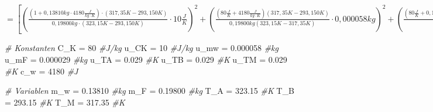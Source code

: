 \documentclass[class=article, crop=false]{standalone}
\newenvironment{Shaded}{\begin{snugshade}}{\end{snugshade}}
\newcommand{\CommentTok}[1]{\textcolor[rgb]{0.56,0.35,0.01}{\textit{#1}}}
\newcommand{\DecValTok}[1]{\textcolor[rgb]{0.00,0.00,0.81}{#1}}
\newcommand{\FloatTok}[1]{\textcolor[rgb]{0.00,0.00,0.81}{#1}}
\newcommand{\NormalTok}[1]{#1}
\newcommand{\OtherTok}[1]{\textcolor[rgb]{0.56,0.35,0.01}{#1}}
\begin{document}
\(=[(\frac{(1+0,13810kg\cdot 4180\frac{J}{kg\cdot K})\cdot (317,35K-293,150K)}{0,19800kg\cdot (323,15K-293,150K)}\cdot 10\frac{J}{K})^2+(\frac{(80\frac{J}{K}+4180\frac{J}{kg\cdot K})(317,35K-293,150K)}{0,19800kg(323,15K-317,35K)}\cdot 0,000058kg)^2+(\frac{(80\frac{J}{K}+0,13810kg\cdot 4180\frac{J}{kg\cdot K})\cdot (1-293,150K)}{0,19800kg(323,15K-1)}\cdot 0,029K)^2+(\frac{(80\frac{J}{K}+0,13810kg\cdot 4180\frac{J}{kg\cdot K})\cdot (317,35K-1)}{0,19800kg(323,15K-317,35K)}\cdot 0,029K)^2+(\frac{(80\frac{J}{K}+0,13810kg\cdot 4180\frac{J}{kg\cdot K})\cdot (317,35K-293,150K)}{323,15K-317,35K}\cdot 0,000029kg)^2+(\frac{(80\frac{J}{K}+0,13810kg\cdot 4180\frac{J}{kg\cdot K})\cdot (317,35K-293,150K)}{0,19800kg(1-317,35K)}\cdot 0,029K)^2]^{\frac{1}{2}}\)

\begin{Shaded}
\begin{Highlighting}[]
\CommentTok{\# Konstanten}
\NormalTok{C\_K }\OtherTok{=} \DecValTok{80} \CommentTok{\#J/kg}
\NormalTok{u\_CK }\OtherTok{=} \DecValTok{10} \CommentTok{\#J/kg}
\NormalTok{u\_mw }\OtherTok{=} \FloatTok{0.000058} \CommentTok{\#kg}
\NormalTok{u\_mF }\OtherTok{=} \FloatTok{0.000029} \CommentTok{\#kg}
\NormalTok{u\_TA }\OtherTok{=} \FloatTok{0.029} \CommentTok{\#K}
\NormalTok{u\_TB }\OtherTok{=} \FloatTok{0.029} \CommentTok{\#K}
\NormalTok{u\_TM }\OtherTok{=} \FloatTok{0.029} \CommentTok{\#K}
\NormalTok{c\_w }\OtherTok{=} \DecValTok{4180} \CommentTok{\#J}

\CommentTok{\# Variablen}
\NormalTok{m\_w }\OtherTok{=} \FloatTok{0.13810} \CommentTok{\#kg}
\NormalTok{m\_F }\OtherTok{=} \FloatTok{0.19800} \CommentTok{\#kg}
\NormalTok{T\_A }\OtherTok{=} \FloatTok{323.15} \CommentTok{\#K}
\NormalTok{T\_B }\OtherTok{=} \FloatTok{293.15} \CommentTok{\#K}
\NormalTok{T\_M }\OtherTok{=} \FloatTok{317.35} \CommentTok{\#K}


\end{Highlighting}
\end{Shaded}
\end{document}

